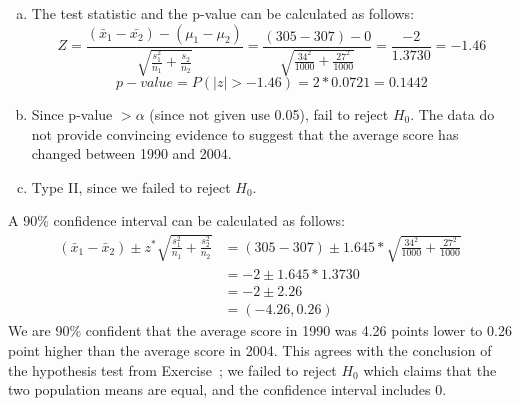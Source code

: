 {{{\begin{enumerate}[(a)]
\begin{enumerate}[1.]
\end{enumerate}
\item The test statistic and the p-value can be calculated as follows:
\[ Z = \frac{(\bar{x}_1 - \bar{x_2}) - (\mu_1 - \mu_2)}{\sqrt{ \frac{s_1^2}{n_1} + \frac{s_2}{n_2} }} = \frac{(305 - 307) - 0}{ \sqrt{\frac{34^2}{1000} + \frac{27^2}{1000}} } = \frac{-2}{1.3730} = -1.46 \]
\[ p-value = P(|z| > -1.46) = 2 * 0.0721 = 0.1442 \]
\item Since p-value $> \alpha$ (since not given use 0.05), fail to reject $H_0$. The data do not provide convincing evidence to suggest that the average score has changed between 1990 and 2004.
\item Type II, since we failed to reject $H_0$.
\end{enumerate}
}\label{mathScore}
}}

%

{
{
A 90\% confidence interval can be calculated as follows:
\begin{align*}
(\bar{x}_1 - \bar{x}_2) \pm z^* \sqrt{ \frac{s_1^2}{n_1} + \frac{s_2^2}{n_2} } &= (305 - 307) \pm 1.645 *  \sqrt{\frac{34^2}{1000} + \frac{27^2}{1000}} \\
&= -2 \pm 1.645 * 1.3730 \\
&= -2 \pm 2.26 \\
&= (-4.26, 0.26)
\end{align*}
We are 90\% confident that the average score in 1990 was 4.26 points lower to 0.26 point higher than the average score in 2004. This agrees with the conclusion of the hypothesis test from Exercise~; we failed to reject $H_0$ which claims that the two population means are equal, and the confidence interval includes 0.
}
}

%


